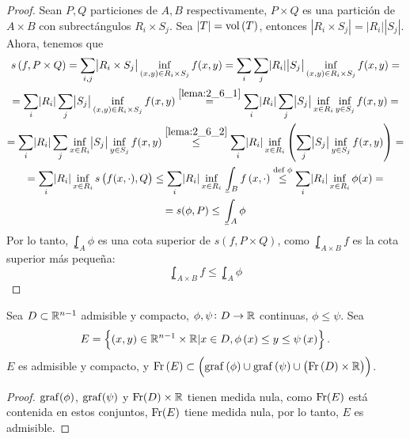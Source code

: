 \begin{proof}
    Sean $P, Q$ particiones de $A, B$ respectivamente, $P\times Q$ es una partición de $A\times B$ con subrectángulos $R_i \times S_j$. Sea $|T| = \operatorname{vol}\left( T\right)$, entonces $|R_i\times S_j| = |R_i||S_j|$. Ahora, tenemos que
    \begin{gather*}
        s\left( f, P \times Q \right) = \sum_{i,j} \abs{R_i \times S_j} \inf_{(x, y)
        \in R_i \times S_j} f(x, y) = \sum_i \sum_j \abs{R_i} \abs{S_j} \inf_{(x, y)
        \in R_i \times S_j} f(x, y) =\\= \sum_i \abs{R_i} \sum_j \abs{S_j} \inf_{(x, y)
        \in R_i \times S_j} f(x, y) \stackrel{\ref{lema:2_6_1}}{=} \sum_i \abs{R_i}
        \sum_j \abs{S_j} \inf_{x \in R_i} \inf_{y \in S_j} f(x, y) = \\ =
        \sum_i \abs{R_i} \sum_j \inf_{x \in R_i} \abs{S_j} \inf_{y \in S_j} f(x, y)
        \stackrel{\ref{lema:2_6_2}}{\leq} \sum_i \abs{R_i} \inf_{x \in R_i} \left(
        \sum_j \abs{S_j} \inf_{y \in S_j} f(x, y)\right) =\\= \sum_i \abs{R_i}
        \inf_{x \in R_i} s\left( f(x, \cdot), Q \right) \leq \sum_i \abs{R_i}
        \inf_{x \in R_i} \lowint_B f\left( x, \cdot \right) \stackrel{\text{def } \phi}
        {\leq} \sum_i \abs{R_i} \inf_{x \in R_i} \phi(x) =\\= s(\phi, P) \leq
        \lowint_A \phi
    \end{gather*}
    Por lo tanto, $\lowint_A \phi$ es una cota superior de $s\left( f, P \times Q
    \right)$, como $\lowint_{A \times B} f$ es la cota superior más pequeña:
    \[
        \lowint_{A \times B} f \leq \lowint_A \phi
    \]
\end{proof}
\begin{lema*}
    Sea $D \subset \mathbb{R}^{n-1}$ admisible y compacto, $\phi, \psi \colon D \to \mathbb{R}$ continuas, $\phi \leq \psi$. Sea
    \[ E = \left\{\left( x,y\right) \in \mathbb{R}^{n-1} \times \mathbb{R} | x\in D, \phi\left( x\right) \leq y \leq \psi\left( x\right) \right\}. \]
    $E$ es admisible y compacto, y $\operatorname{Fr}\left( E\right) \subset \left( \operatorname{graf}\left(\phi\right) \cup \operatorname{graf}\left(\psi\right)\cup\left( \operatorname{Fr}\left( D\right)\times\mathbb{R}\right) \right)$.
\end{lema*}

\begin{proof}
    $\operatorname{graf} (\phi)$, $\operatorname{graf}(\psi)$ y $\operatorname{Fr}(D) \times \mathbb{R}$ tienen medida nula, como
    $\operatorname{Fr}(E)$ está contenida en estos conjuntos, $\operatorname{Fr}(E)$ tiene medida nula, por lo
    tanto, $E$ es admisible.
\end{proof}

